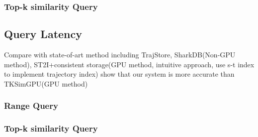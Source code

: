 \documentclass[conference]{IEEEtran}
\begin{document}
\subsubsection{Top-k similarity Query}

\subsection{Query Latency}

Compare with state-of-art method including TrajStore, SharkDB(Non-GPU method), ST2I+consistent storage(GPU method, intuitive approach, use s-t index to implement trajectory index) 
show that our system is more accurate than TKSimGPU(GPU method)

\subsubsection{Range Query}

\subsubsection{Top-k similarity Query}





%
%

\end{document}
